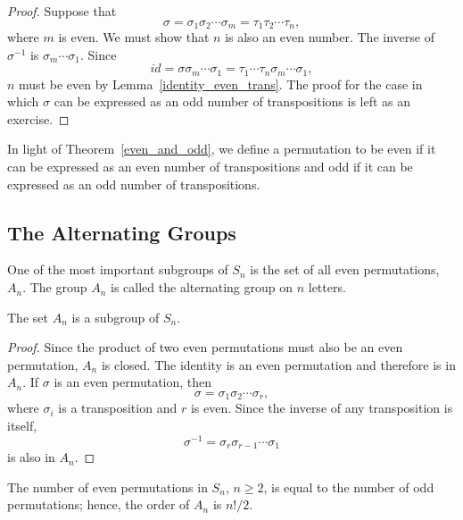 \begin{proof}
Suppose that
\[
\sigma = \sigma_1 \sigma_2 \cdots \sigma_m = \tau_1 \tau_2 \cdots
\tau_n, 
\]
where $m$ is even. We must show that $n$ is also an even number.  The
inverse of $\sigma^{-1}$ is $\sigma_m \cdots \sigma_1$. Since 
\[
id = \sigma \sigma_m \cdots \sigma_1
= \tau_1  \cdots \tau_n \sigma_m \cdots \sigma_1,
\]
$n$ must be even by Lemma~\ref{identity_even_trans}.  The proof for the case in which
$\sigma$ can be expressed as an odd number of transpositions is left
as an exercise.  
\end{proof}
 
\medskip
 
In light of Theorem~\ref{even_and_odd}, we define a permutation to be {\bfi
even} if  
it can be expressed as an even number of transpositions and {\bfi
odd}  
if it can be expressed as an odd number of transpositions.
 
 
\subsection*{The Alternating Groups}

One of the most important subgroups of $S_n$ is the set of
all even permutations, $A_n$\label{alternatinggroup}.  The group $A_n$ is called the {\bfi
alternating group on $n$ letters}. 
 
 
\begin{theorem}
The set $A_n$ is a subgroup of $S_n$.
\end{theorem}
 
 
\begin{proof}
Since the product of two even permutations must also be an even
permutation, $A_n$ is closed.  The identity is an even permutation and
therefore is in $A_n$. If $\sigma$ is an even permutation, then
\[
\sigma = \sigma_1 \sigma_2 \cdots \sigma_r,
\]
where $\sigma_i$ is a transposition and $r$ is even. Since the inverse
of any transposition is itself, 
\[
\sigma^{-1} = \sigma_r \sigma_{r-1} \cdots \sigma_1
\]
is also in $A_n$.
\end{proof}
 
 
\begin{proposition}
The number of even permutations in $S_n$, $n \geq 2$, is equal to the
number of odd permutations; hence, the order of $A_n$ is $n!/2$.
\end{proposition}
 
